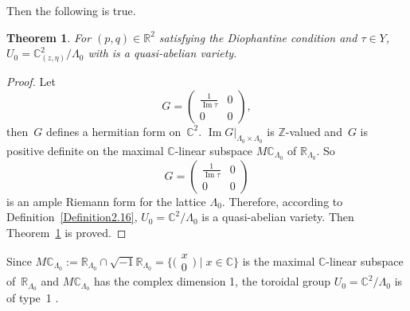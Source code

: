 \documentclass[pdftex]{sigma}
\numberwithin{equation}{section}
\newtheorem{Theorem}{Theorem}[section]
\begin{document}
Then the following is true.

\begin{Theorem}\label{Theorem2.17}
For $(p,q) \in \mathbb{R}^2$ satisfying the Diophantine condition and $\tau \in Y$, $U_0={\mathbb{C}^2_{(z,\eta)}}/{\Lambda_0}$ with  is a quasi-abelian variety.
\end{Theorem}

\begin{proof}
Let
\[
G=\left(\begin{matrix}\frac{1}{\operatorname{\operatorname{Im}}\tau} & 0\\0 & 0\end{matrix}\right),
\]
 then~$G$ defines a hermitian form on~$\mathbb{C}^2$. $\operatorname{ Im}G|_{\Lambda_0\times \Lambda_0}$ is $\mathbb{Z}$-valued and~$G$ is positive definite on the maximal $\mathbb{C}$-linear subspace $M\mathbb{C}_{\Lambda_0}$ of $\mathbb{R}_{\Lambda_{0}}$. So
 \[
 G=\left(\begin{matrix}\frac{1}{\operatorname{\operatorname{Im}}\tau} & 0\\0 & 0\end{matrix}\right)
 \]
 is an ample Riemann form for the lattice $\Lambda_0$. Therefore, according to Definition~\ref{Definition2.16}, $U_0=\mathbb{C}^2/\Lambda_0$ is a quasi-abelian variety. Then Theorem~\ref{Theorem2.17} is proved.
\end{proof}

Since $M\mathbb{C}_{\Lambda_0}:=\mathbb{R}_{\Lambda_0}\cap\sqrt{-1}\mathbb{R}_{\Lambda_0}=\big \{ \bigl(\begin{smallmatrix}x \\0\end{smallmatrix}\bigr)\mid x\in \mathbb{C}\big \}$ is the maximal $\mathbb{C}$-linear subspace of~$\mathbb{R}_{\Lambda_0}$ and $M\mathbb{C}_{\Lambda_0}$ has the complex dimension 1, the toroidal group $U_0=\mathbb{C}^2/\Lambda_0$ is of type~1 \cite[Defi\-nition~1.2.1]{Yukitaka-Klaus}.
\end{document}
